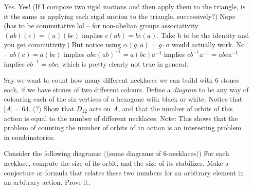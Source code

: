 \documentclass[1    0pt, answers]{exam} \renewcommand{\baselinestretch}{1.05}
\theoremstyle{plain}
\theoremstyle{definition}
\begin{document}
\begin{questions}
\begin{solution}
Yes.
Yes! (If I compose two rigid motions and then apply them to the triangle, is it the same as applying each rigid motion to the triangle, successively?) 
Nope (has to be commutative lol -- for non-abelian groups associativity $(ab)(c) = (a)(bc)$ implies $c(ab) = bc(a)$. Take b to be the identity and you get commutivity.) But notice using $\alpha(g, a) = g \cdot a$ would actually work.
No -- $ab(c) = a(bc)$ implies $ab c (ab)^{-1} = a (bc) a^{-1}$ implies $c b^{-1} a^{-1} = a bc a^{-1}$ implies $c b^{-1} = abc$, which is pretty clearly not true in general.
\end{solution}

\question Say we want to count how many different necklaces we can build with 6 stones each, if we have stones of two different colours. Define a \emph{diagram} to be any way of colouring each of the six vertices of a hexagone with black or white. Notice that $|A| = 64$. (?) Show that $D_{12}$ acts on $A$, and that the number of orbits of this action is equal to the number of different necklaces.
Note: This shows that the problem of counting the number of orbits of an action is an interesting problem in combinatorics.

\question Consider the following diagrams: ((some diagrams of 6-necklaces))
For each necklace, compute the size of its orbit, and the size of its stabilizer. Make a conjecture or formula that relates these two numbers for an arbitrary element in an arbitrary action. Prove it.
\end{questions}
\end{document}
